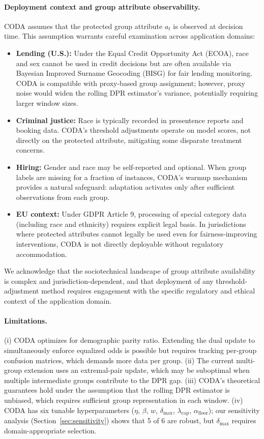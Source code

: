 \documentclass[10pt,twocolumn]{article}
\theoremstyle{definition}
\begin{document}
\paragraph{Deployment context and group attribute observability.}
CODA assumes that the protected group attribute $a_t$ is observed at decision time. This assumption warrants careful examination across application domains:
\begin{itemize}
    \item \textbf{Lending (U.S.):} Under the Equal Credit Opportunity Act (ECOA), race and sex cannot be used in credit decisions but are often available via Bayesian Improved Surname Geocoding (BISG) for fair lending monitoring. CODA is compatible with proxy-based group assignment; however, proxy noise would widen the rolling DPR estimator's variance, potentially requiring larger window sizes.
    \item \textbf{Criminal justice:} Race is typically recorded in presentence reports and booking data. CODA's threshold adjustments operate on model scores, not directly on the protected attribute, mitigating some disparate treatment concerns.
    \item \textbf{Hiring:} Gender and race may be self-reported and optional. When group labels are missing for a fraction of instances, CODA's warmup mechanism provides a natural safeguard: adaptation activates only after sufficient observations from each group.
    \item \textbf{EU context:} Under GDPR Article 9, processing of special category data (including race and ethnicity) requires explicit legal basis. In jurisdictions where protected attributes cannot legally be used even for fairness-improving interventions, CODA is not directly deployable without regulatory accommodation.
\end{itemize}
We acknowledge that the sociotechnical landscape of group attribute availability is complex and jurisdiction-dependent, and that deployment of any threshold-adjustment method requires engagement with the specific regulatory and ethical context of the application domain.

\paragraph{Limitations.}
(i) CODA optimizes for demographic parity ratio. Extending the dual update to simultaneously enforce equalized odds is possible but requires tracking per-group confusion matrices, which demands more data per group. (ii) The current multi-group extension uses an extremal-pair update, which may be suboptimal when multiple intermediate groups contribute to the DPR gap. (iii) CODA's theoretical guarantees hold under the assumption that the rolling DPR estimator is unbiased, which requires sufficient group representation in each window. (iv) CODA has six tunable hyperparameters ($\eta$, $\beta$, $w$, $\delta_{\max}$, $\lambda_{\text{cap}}$, $\alpha_{\text{floor}}$); our sensitivity analysis (Section~\ref{sec:sensitivity}) shows that 5 of 6 are robust, but $\delta_{\max}$ requires domain-appropriate selection.
\end{document}
